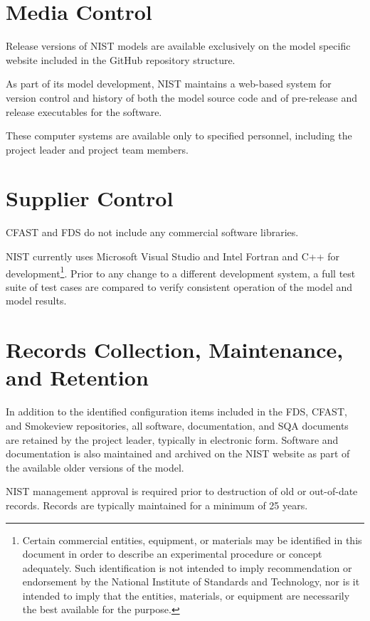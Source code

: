 \documentclass[11pt]{book}
\begin{document}
\section{Media Control}

Release versions of NIST models are available exclusively on the model specific website included in the GitHub repository structure.

As part of its model development, NIST maintains a web-based system for version control and history of both the model source code and of pre-release and release executables for the software.

These computer systems are available only to specified personnel, including the project leader and project team members.

\section{Supplier Control}

CFAST and FDS do not include any commercial software libraries.

NIST currently uses Microsoft Visual Studio and Intel Fortran and C++ for development\footnote{Certain commercial entities, equipment, or materials may be identified in this document in order to describe an experimental procedure or concept adequately. Such identification is not intended to imply recommendation or endorsement by the National Institute of Standards and Technology, nor is it intended to imply that the entities, materials, or equipment are necessarily the best available for the purpose.}.  Prior to any change to a different development system, a full test suite of test cases are compared to verify consistent operation of the model and model results.

\section{Records Collection, Maintenance, and Retention}

In addition to the identified configuration items included in the FDS, CFAST, and Smokeview repositories, all software, documentation, and SQA documents are retained by the project leader, typically in electronic form. Software and documentation is also maintained and archived on the NIST website as part of the available older versions of the model.

NIST management approval is required prior to destruction of old or out-of-date records. Records are typically maintained for a minimum of 25 years.
\end{document}
